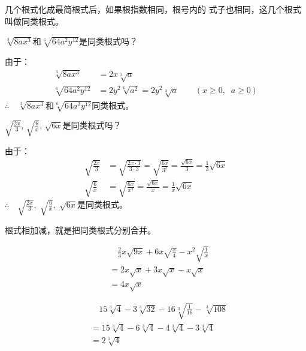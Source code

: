 几个根式化成最简根式后，如果根指数相同，根号内的
式子也相同，这几个根式叫做同类根式。


\begin{example}
    $\sqrt[3]{8ax^3}$和$\sqrt[6]{64a^2y^{12}}$是同类根式吗？
\end{example}
    
\begin{solution}
    由于：
\[\begin{split}
    \sqrt[3]{8ax^3}&=2x\sqrt[3]{a}\\
    \sqrt[6]{64a^2y^{12}}&=2y^2\sqrt[6]{a^2}=2y^2\sqrt[3]{a}\qquad (x\ge 0,\;\; a\ge 0)
\end{split}\]    
    $\therefore\quad \sqrt[3]{8ax^3}$和$\sqrt[6]{64a^2y^{12}}$同类根式。
\end{solution}


\begin{example}
    $\sqrt{\frac{2x}{3}}$, $\sqrt{\frac{6}{x}}$, $\sqrt{6x}$是同类根式吗？
\end{example}


\begin{solution}
    由于：
\[\begin{split}
    \sqrt{\frac{2x}{3}}&=\sqrt{\frac{2x\cdot 3}{3\cdot 3}}=\sqrt{\frac{6x}{3^2}}=\frac{\sqrt{6x}}{3}=\frac{1}{3}\sqrt{6x} \\
    \sqrt{\frac{6}{x}}&= \sqrt{\frac{6x}{x^2}}=\frac{\sqrt{6x}}{x}=\frac{1}{x}\sqrt{6x}
\end{split}\]    
    $\therefore\quad \sqrt{\frac{2x}{3}},\; \sqrt{\frac{6}{x}},\;  \sqrt{6x}$是同类根式。
\end{solution}

根式相加减，就是把同类根式分别合并。


\begin{example}
    \[\begin{split}
       &\quad  \frac{2}{3}x\sqrt{9x}+6x\sqrt{\frac{x}{4}}-x^2\sqrt{\frac{1}{x}}\\
&=2x\sqrt{x}+3x\sqrt{x}-x\sqrt{x}\\
&=4x\sqrt{x}
    \end{split}\]
\end{example}
    
\begin{example}
    \[\begin{split}
        &\quad 15\sqrt[3]{4}-3\sqrt[3]{32}-16\sqrt[3]{\frac{1}{16}}-\sqrt[3]{108}\\
        &=15\sqrt[3]{4}-6\sqrt[3]{4}-4\sqrt[3]{4}-3\sqrt[3]{4}\\
        &=2\sqrt[3]{4}
    \end{split}\] 
\end{example}

